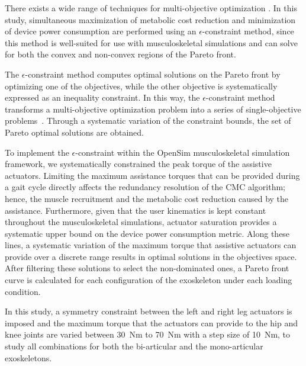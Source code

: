 \documentclass[10pt,letterpaper]{article}
\begin{document}
There exists a wide range of techniques for multi-objective optimization \cite{Marler2004,Miettinen2008,Jakob2014}. In this study, simultaneous maximization of  metabolic cost reduction and minimization of device power consumption are performed using an $\epsilon$-constraint method, since this method is well-suited for use with musculoskeletal simulations and can solve for both the convex and non-convex regions of the Pareto front.

The $\epsilon$-constraint method computes optimal solutions on the Pareto front by optimizing one of the objectives, while the other objective is systematically expressed as an inequality constraint. In this way, the $\epsilon$-constraint method transforms a multi-objective optimization problem into a series of single-objective problems~\cite{Yacov1971,Laumanns2006,Chircop2013}. Through a systematic variation of the constraint bounds, the set of Pareto optimal solutions are obtained. %

To implement the $\epsilon$-constraint within the OpenSim musculoskeletal simulation framework, we systematically constrained the peak torque of the assistive actuators. Limiting the maximum assistance torques that can be provided during a gait cycle directly affects the redundancy resolution of the CMC algorithm; hence, the muscle recruitment and the metabolic cost reduction caused by the assistance.  Furthermore, given that the user kinematics is kept constant throughout the musculoskeletal simulations,  actuator saturation provides a systematic upper bound on the device power consumption metric. Along these lines, a systematic variation of the maximum torque that assistive actuators can provide over a discrete range results in optimal solutions in the objectives space. After filtering these solutions to select the non-dominated ones, a Pareto front curve is calculated for each configuration of the exoskeleton under each loading condition.


In this study, a symmetry constraint between the left and right leg actuators is imposed and the maximum torque that the actuators can provide to the hip and knee joints are varied between 30~Nm to 70~Nm with a step size of 10~Nm, to study all combinations for both the bi-articular and the mono-articular exoskeletons.
\end{document}
